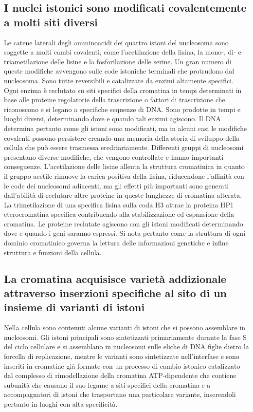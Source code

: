 \subsection{I nuclei istonici sono modificati covalentemente a molti siti diversi}
Le catene laterali degli amminoacidi dei quattro istoni del nucleosoma sono soggette a molti cambi covalenti, come l'acetilazione della lisina, la mono-, di- e triametilazione delle 
lisine e la fosforilazione delle serine. Un gran numero di queste modifiche avvengono sulle code istoniche  terminali che protrudono dal nucleosoma. Sono tutte reversibili e 
catalizzate da enzimi altamente specifici. Ogni enzima \`e reclutato su siti specifici della cromatina in tempi determinati in base alle proteine regolatorie della trascrizione o 
fattori di trascrizione che riconoscono e si legano a specifiche sequenze di DNA. Sono prodotte in tempi e luoghi diversi, determinando dove e quando tali enzimi agiscono. Il DNA 
determina pertanto come gli istoni sono modificati, ma in alcuni casi le modifiche covalenti possono persistere creando una memoria della storia di sviluppo della cellula che pu\`o 
essere trasmessa ereditariamente. Differenti gruppi di nucleosomi presentano diverse modifiche, che vengono controllate e hanno importanti conseguenze. L'acetilazione delle lisine 
allenta la struttura cromatinica in quanto il gruppo acetile rimuove la carica positiva della lisina, riducendone l'affinit\`a con le code dei nucleosomi adiacenti, ma gli effetti pi\`u 
importanti sono generati dall'abilit\`a di reclutare altre proteine in queste lunghezze di cromatina alterata. La trimetilazione di una specifica lisina sulla coda H3 attrae la proteina
HP1 eterocromatina-specifica contribuendo alla stabilizzazione ed espansione della cromatina. Le proteine reclutate agiscono con gli istoni modificati determinando dove e quando i geni
saranno espressi. Si nota pertanto come la struttura di ogni dominio cromatinico governa la lettura delle informazioni genetiche e infine struttura e funzioni della cellula.
\subsection{La cromatina acquisisce variet\`a addizionale attraverso inserzioni specifiche al sito di un insieme di varianti di istoni}
Nella cellula sono contenuti alcune varianti di istoni che si possono assemblare in nucleosomi. Gli istoni principali sono sintetizzati primariamente durante la fase S del ciclo 
cellulare e si assemblano in nucleosomi sulle eliche di DNA figlie dietro la forcella di replicazione, mentre le varianti sono sintetizzate nell'interfase e sono inseriti in cromatine
gi\`a formate con un processo di cambio istonico catalizzato dal complesso di rimodellazione della cromatina ATP-dipendente che contiene subunit\`a che causano il suo legame a siti 
specifici della cromatina e a accompagnatori di istoni che trasportano una particolare variante, inserendoli pertanto in luoghi con alta specificit\`a.
